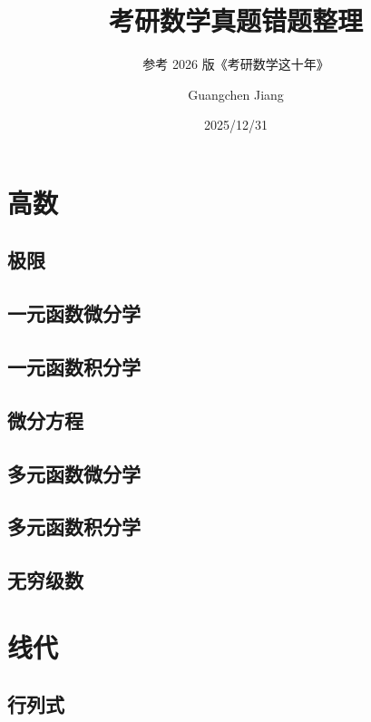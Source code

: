 \documentclass[lang=cn,math=mtpro2,11pt,scheme=chinese]{elegantbook}
\title{考研数学真题错题整理}
\subtitle{参考 2026 版《考研数学这十年》}
\author{Guangchen Jiang}
\date{2025/12/31}
\begin{document}
\maketitle
\frontmatter

\tableofcontents

\mainmatter

\chapter{高数}

\section{极限}

\vspace{2em}

\section{一元函数微分学}

\vspace{2em}

\section{一元函数积分学}

\section{微分方程}

\section{多元函数微分学}

\section{多元函数积分学}

\section{无穷级数}

\chapter{线代}

\section{行列式}

\vspace{2em}
\end{document}
